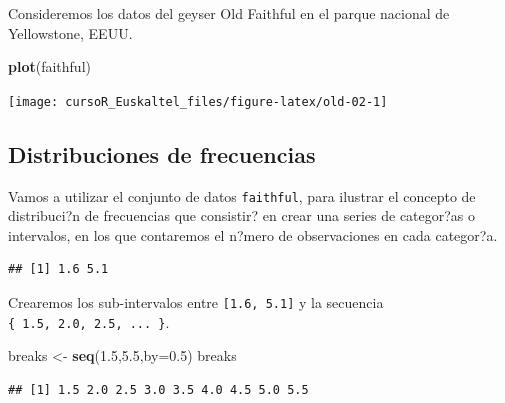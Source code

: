 \documentclass[]{book}
\newenvironment{Shaded}{\begin{snugshade}}{\end{snugshade}}
\newcommand{\KeywordTok}[1]{\textcolor[rgb]{0.13,0.29,0.53}{\textbf{#1}}}
\newcommand{\DataTypeTok}[1]{\textcolor[rgb]{0.13,0.29,0.53}{#1}}
\newcommand{\FloatTok}[1]{\textcolor[rgb]{0.00,0.00,0.81}{#1}}
\newcommand{\StringTok}[1]{\textcolor[rgb]{0.31,0.60,0.02}{#1}}
\newcommand{\OperatorTok}[1]{\textcolor[rgb]{0.81,0.36,0.00}{\textbf{#1}}}
\newcommand{\NormalTok}[1]{#1}
\begin{document}
Consideremos los datos del geyser Old Faithful en el parque nacional de
Yellowstone, EEUU.

\begin{Shaded}
\begin{Highlighting}[]
\KeywordTok{plot}\NormalTok{(faithful)}
\end{Highlighting}
\end{Shaded}

\begin{center}\texttt{[image: cursoR\_Euskaltel\_files/figure-latex/old-02-1]} \end{center}

\subsection{Distribuciones de
frecuencias}\label{distribuciones-de-frecuencias}

Vamos a utilizar el conjunto de datos \texttt{faithful}, para ilustrar
el concepto de distribuci?n de frecuencias que consistir? en crear una
series de categor?as o intervalos, en los que contaremos el n?mero de
observaciones en cada categor?a.

\begin{Shaded}
\end{Shaded}

\begin{verbatim}
## [1] 1.6 5.1
\end{verbatim}

Crearemos los sub-intervalos entre \texttt{{[}1.6,\ 5.1{]}} y la
secuencia \texttt{\{\ 1.5,\ 2.0,\ 2.5,\ ...\ \}}.

\begin{Shaded}
\begin{Highlighting}[]
\NormalTok{breaks <-}\StringTok{ }\KeywordTok{seq}\NormalTok{(}\FloatTok{1.5}\NormalTok{,}\FloatTok{5.5}\NormalTok{,}\DataTypeTok{by=}\FloatTok{0.5}\NormalTok{)}
\NormalTok{breaks}
\end{Highlighting}
\end{Shaded}

\begin{verbatim}
## [1] 1.5 2.0 2.5 3.0 3.5 4.0 4.5 5.0 5.5
\end{verbatim}
\end{document}
